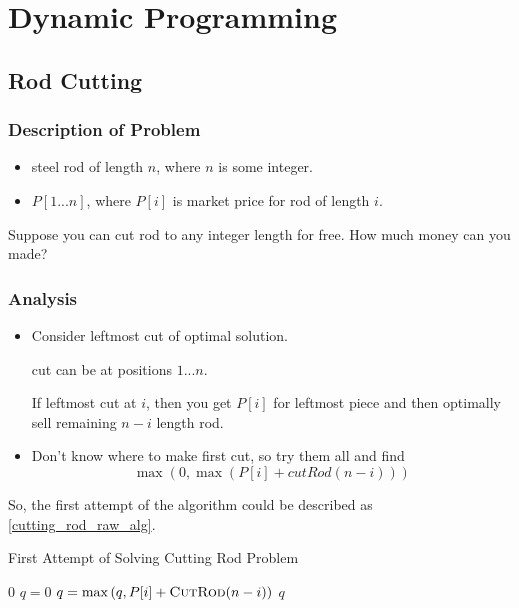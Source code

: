 \section{Dynamic Programming}

\subsection{Rod Cutting}

\subsubsection{Description of Problem}

\begin{itemize}
\item steel rod of length $n$, where $n$ is some integer.
\item $P[1...n]$, where $P[i]$ is market price for rod of length $i$.
\end{itemize}

\question

Suppose you can cut rod to any integer length for free.
How much money can you made?

\subsubsection{Analysis}

\begin{itemize}
\item Consider leftmost cut of optimal solution.

cut can be at positions $1...n$.

If leftmost cut at $i$, then you get $P[i]$ for leftmost piece and then optimally sell remaining $n-i$ length rod.

\item Don't know where to make first cut, so try them all and find
\[\max\left(0, \max(P[i] + cutRod(n-i))\right)\]
\end{itemize}

So, the first attempt of the algorithm could be described as \cref{cutting_rod_raw_alg}.

\begin{algorithm}[H]
\caption{First Attempt of Solving Cutting Rod Problem}\label{cutting_rod_raw_alg}
\begin{algorithmic}[1]
 
    \Return $0$
\EndIf
\State $q=0$
    \State $q = \max\left(q, P[i]+\textsc{CutRod} (n-i)\right)$
\EndFor
\Return $q$
\EndProcedure
\end{algorithmic}
\end{algorithm}

